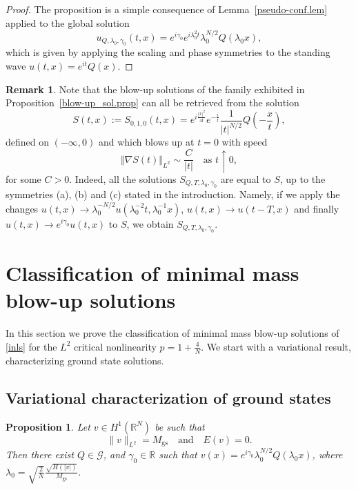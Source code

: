 \documentclass[reqno]{amsart}
\newcommand{\real}{\mathbb{R}}
\newcommand{\rn}{\real^N}
\newcommand{\R}{\mathbb{R}}
\newcommand{\disp}{\displaystyle}
\theoremstyle{plain}
\newtheorem{proposition}{Proposition}
\theoremstyle{definition}
\newtheorem{remark}{Remark}
\numberwithin{equation}{section}
\begin{document}
\begin{proof}
The proposition is a simple consequence of Lemma~\ref{pseudo-conf.lem} applied to the global solution
\[
u_{Q,\lambda_0,\gamma_0}(t,x) = e^{i\gamma_0} e^{i\lambda_0^2 t}\lambda_0^{N/2}Q(\lambda_0x),
\]
which is given by applying the scaling and phase symmetries to the standing wave $u(t,x)=e^{it}Q(x)$.
\end{proof}

\begin{remark}
Note that the blow-up solutions of the family exhibited in Proposition~\ref{blow-up_sol.prop} 
can all be retrieved from the solution
\[
S(t,x) := S_{0,1,0}(t,x) = e^{i\frac{|x|^2}{4t}} e^{-\frac{i}{t}} \frac{1}{|t|^{N/2}}Q\left(-\frac{x}{t}\right),
\]
defined on $(-\infty,0)$ and which blows up at $t=0$ with speed
\[
\Vert\nabla S(t)\Vert_{L^2} \sim \frac{C}{|t|}\quad \text{as } t\uparrow0,
\]
for some $C>0$. Indeed, all the solutions $S_{Q,T,\lambda_0,\gamma_0}$ are equal to $S$,
up to the symmetries (a), (b) and (c) stated in the introduction.
Namely, if we apply the changes $u(t,x)\to \lambda_0^{-N/2}u(\lambda_0^{-2}t,\lambda_0^{-1}x)$, 
$u(t,x)\to u(t-T,x)$
and finally $u(t,x)\to e^{i\gamma_0}u(t,x)$ to $S$, we obtain $S_{Q,T,\lambda_0,\gamma_0}$.
\end{remark}


\section{Classification of minimal mass blow-up solutions}
In this section we prove the classification of minimal mass blow-up solutions of \eqref{inls}
for the $L^2$ critical nonlinearity $p=1+\frac4N$.
We start with a variational result, characterizing ground state solutions.

\subsection{Variational characterization of ground states}

\begin{proposition}\label{charact.prop}
Let $v\in H^1(\rn)$ be such that 
\begin{equation} \label{varchar}
\|v\|_{L^2}=M_\mathrm{gs} \quad \text{and} \quad E(v)=0.
\end{equation}
Then there exist $Q\in\mathcal{G}$, and $\gamma_0 \in \R$ 
such that $v(x)=e^{i\gamma_0}\lambda_0^{N/2}Q(\lambda_0x)$,
where $\disp\lambda_0=\sqrt{\frac{2}{N}}\frac{\sqrt{H(|v|)}}{M_\mathrm{gs}}$.
\end{proposition}
\end{document}
